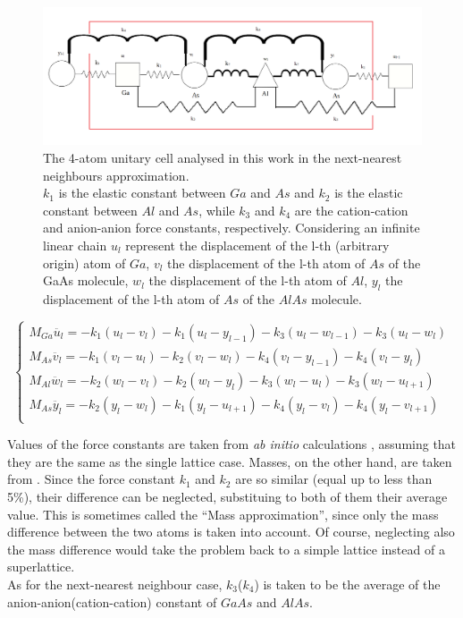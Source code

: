 \documentclass{article}
\begin{document}
\begin{figure}
	\centering
	\includegraphics[width=0.7\linewidth]{cella2.png}
	\caption{The 4-atom unitary cell analysed in this work in the next-nearest neighbours approximation.\\
	$k_1$ is the elastic constant between $Ga$ and $As$ and $k_2$ is the elastic constant between $Al$ and $As$, while $k_3$ and $k_4$ are the cation-cation and anion-anion force constants, respectively. Considering an infinite linear chain $u_l$ represent the displacement of the l-th (arbitrary origin) atom of $Ga$, $v_l$ the displacement of the l-th atom of $As$ of the GaAs molecule, $w_l$ the displacement of the l-th atom of $Al$, $y_l$ the displacement of the l-th atom of $As$ of the $AlAs$ molecule.   }
	\label{fig:cella2}
\end{figure}
\begin{equation}
	\begin{cases}
		M_{Ga}\ddot{u_l} = -k_1(u_l-v_l) - k_1(u_l-y_{l-1}) - k_3(u_l -w_{l-1}) - k_3(u_l - w_{l})	 \\
		M_{As}\ddot{v_l} = -k_1(v_l-u_l) - k_2(v_l-w_l)	- k_4(v_l -y_{l-1}) - k_4(v_l - y_{l})	 	 \\
		M_{Al}\ddot{w_l} = -k_2(w_l-v_l) - k_2(w_l-y_l)	- k_3(w_l - u_l) - k_3(w_l - u_{l+1})	 	 \\
		M_{As}\ddot{y_l} = -k_2(y_l-w_l) - k_1(y_l-u_{l+1})- k_4(y_l -v_l) - k_4(y_l - v_{l+1})	  \\
	\end{cases}
	\label{eq:sistema}	
\end{equation}

Values of the force constants are taken from \emph{ab initio} calculations \cite[Table 2]{Molinari}, assuming that they are the same as the single lattice case. Masses, on the other hand, are taken from \cite{IUPAC}.
Since the force constant $k_1$ and $k_2$ are so similar (equal up to less than 5\%), their difference can be neglected, substituing to both of them their average value. This is sometimes called the “Mass approximation”, since only the mass difference between the two atoms is taken into account. Of course, neglecting also the mass difference would take the problem back to a simple lattice instead of a superlattice.\\
As for the next-nearest neighbour case, $k_3$($k_4$) is taken to be the average of the anion-anion(cation-cation) constant of $GaAs$ and $AlAs$.
\end{document}
